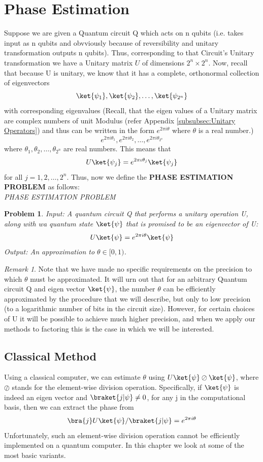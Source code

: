 \documentclass[12pt, oneside]{book}
\newtheorem{problem}{Problem}[section]
\theoremstyle{definition}
\theoremstyle{definition}
\theoremstyle{remark}
\newtheorem*{remark}{Remark}
\begin{document}
\section{Phase Estimation}
Suppose we are given a Quantum circuit Q which acts on n qubits (i.e. takes input as n qubits and obvviously because of reversibility and unitary transformation outputs n qubits).
Thus, corresponding to that Circuit's Unitary transformation we have a Unitary matrix $U$ of dimensions $2^n \times 2^n$.
Now, recall that because U is unitary, we know that it has a complete, orthonormal collection of eigenvectors
\[
\ket{\psi_1},\ket{\psi_2},\ldots,\ket{\psi_{2^n}}
\]
with corresponding eigenvalues (Recall, that the eigen values of a Unitary matrix are complex numbers of unit Modulus (refer Appendix \ref{subsubsec:Unitary Operators})
and thus can be written in the form $e^{2\pi i \theta}$ where $\theta$ is a real number.)
\[
e^{2\pi i \theta_1},e^{2\pi i \theta_2},\ldots,e^{2\pi i \theta_{2^n}}
\]
where $\theta_1,\theta_2,\ldots,\theta_{2^n}$ are real numbers. This means that 
\[
U\ket{\psi_j}=e^{2\pi\iota \theta_j}\ket{\psi_j}
\]
for all $j=1,2,\ldots,2^n$. Thus, now we define the \textbf{PHASE ESTIMATION PROBLEM} as follows:\\
\textit{PHASE ESTIMATION PROBLEM}
\begin{problem}
    Input: A quantum circuit Q that performs a unitary operation U, along with wa quantum state $\ket{\psi}$ that is promised to be an eigenvector of U:
    \[
    U\ket{\psi}=e^{2\pi i \theta}\ket{\psi}
    \]
    Output: An approximation to $\theta \in [0,1)$.
\end{problem}

\begin{remark}
    Note that we have made no specific requirements on the precision to which $\theta$ must be approximated. 
    It will urn out that for an arbitrary Quantum circuit Q and eigen vector $\ket{\psi}$, the number $\theta$ can be efficiently approximated by the procedure that we will describe, but only to low precision (to a logarithmic number of bits in the circuit size).
    However, for certain choices of U it will be possible to achieve much higher precision, and when we apply our methods to factoring this is the case in which we will be interested.
\end{remark}

\subsection{Classical Method}
Using a classical computer, we can estimate $\theta$ using $U\ket{\psi} \oslash \ket{\psi}$, where $\oslash$ stands for the element-wise division operation. Specifically, 
if $\ket{\psi}$ is indeed an eigen vector and $\braket{j|\psi}\neq 0$, for any j in the computational basis, then we can extract the phase from
\[
\bra{j}U\ket{\psi}/\braket{j|\psi}=e^{2\pi i \theta}
\]
Unfortunately, such an element-wise division operation cannot be efficiently implemented on a quantum computer.
In this chapter we look at some of the most basic variants.
\end{document}
